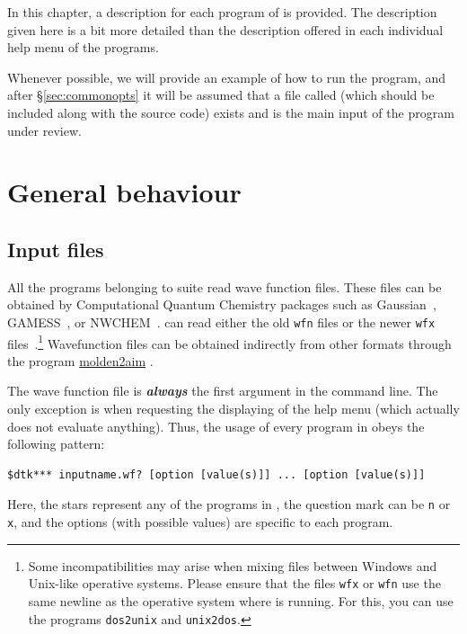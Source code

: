 In this chapter, a description for each program of \DTK{} is provided. The description given here is a bit more detailed than the description offered in each individual help menu of the programs.

Whenever possible, we will provide an example of how to run the program, and after \S\ref{sec:commonopts} it will be assumed that a file called
\wfexfile{} (which should be included along with the source code) exists and is the main input of the program under review.

\section{General behaviour}

\subsection{Input files}

All the programs belonging to \DTK{} suite read wave function files. These files can be obtained by Computational Quantum Chemistry packages such as Gaussian~\cite{bib:gaussian09}, GAMESS~\cite{bib:gamess}, or NWCHEM~\cite{bib:nwchem}. \DTK{} can read either the old \texttt{wfn} files or the newer \texttt{wfx} files~\cite{bib:webwfxformat}.\footnote{Some incompatibilities may arise when mixing files between Windows and Unix-like operative systems. Please ensure that the files \texttt{wfx} or \texttt{wfn} use the same newline as the operative system where \DTK{} is running. For this, you can use the programs \texttt{dos2unix} and \texttt{unix2dos}.} Wavefunction files can be obtained indirectly from other formats through
the program \href{https://github.com/zorkzou/Molden2AIM}{molden2aim} \cite{bib:molden2aim}.

The wave function file is \textbf{\textit{always}} the first argument in the command line.
The only exception is when requesting the displaying of the help menu (which actually
does not evaluate anything). Thus, the usage of every program in \DTK{} obeys the
following pattern:
\begin{lstlisting}
$dtk*** inputname.wf? [option [value(s)]] ... [option [value(s)]]
\end{lstlisting}
Here, the stars represent any of the programs in \DTK, the question mark can be \texttt{n} or \texttt{x}, and the options (with possible values) are specific to each program.

